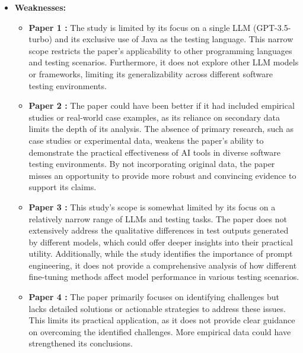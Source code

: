\documentclass[12pt,a4paper]{article}
\begin{document}
\begin{itemize}
\begin{itemize}
\begin{itemize}
        \end{itemize}
        \item \textbf{Weaknesses:} 
        \begin{itemize}
            \item \textbf{Paper 1 :} The study is limited by its focus on a single LLM (GPT-3.5-turbo) and its exclusive use of Java as the testing language. This narrow scope restricts the paper’s applicability to other programming languages and testing scenarios. Furthermore, it does not explore other LLM models or frameworks, limiting its generalizability across different software testing environments.

            \item \textbf{Paper 2 :} The paper could have been better if it had included empirical studies or real-world case examples, as its reliance on secondary data limits the depth of its analysis. The absence of primary research, such as case studies or experimental data, weakens the paper's ability to demonstrate the practical effectiveness of AI tools in diverse software testing environments. By not incorporating original data, the paper misses an opportunity to provide more robust and convincing evidence to support its claims.

            \item \textbf{Paper 3 :} This study's scope is somewhat limited by its focus on a relatively narrow range of LLMs and testing tasks. The paper does not extensively address the qualitative differences in test outputs generated by different models, which could offer deeper insights into their practical utility. Additionally, while the study identifies the importance of prompt engineering, it does not provide a comprehensive analysis of how different fine-tuning methods affect model performance in various testing scenarios.

            \item \textbf{Paper 4 :} The paper primarily focuses on identifying challenges but lacks detailed solutions or actionable strategies to address these issues. This limits its practical application, as it does not provide clear guidance on overcoming the identified challenges. More empirical data could have strengthened its conclusions.
            

\end{itemize}
\end{itemize}
\end{itemize}
\end{document}

